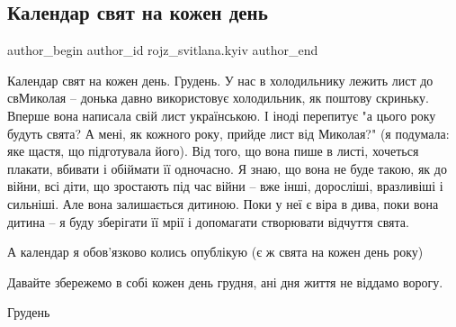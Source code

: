  
 
 
 
 
 
\subsection{Календар свят на кожен день}
\label{sec:12_12_2022.fb.rojz_svitlana.kyiv.1.kalendar}
 
\ifcmt
 author_begin
   author_id rojz_svitlana.kyiv
 author_end
\fi

Календар свят на кожен день. Грудень. У нас в холодильнику лежить лист до
свМиколая – донька давно використовує холодильник, як поштову скриньку. Вперше
вона написала свій лист українською.  І іноді перепитує "а цього року будуть
свята? А мені, як кожного року, прийде лист від Миколая?" (я подумала: яке
щастя, що підготувала його). Від того, що вона пише в листі, хочеться плакати,
вбивати і обіймати її одночасно. Я знаю, що вона не буде такою, як до війни,
всі діти, що зростають під час війни – вже інші, доросліші, вразливіші і
сильніші. Але вона залишається дитиною. Поки у неї є віра в дива, поки вона
дитина  – я буду зберігати її мрії і допомагати створювати відчуття свята. 

А календар я обов'язково колись опублікую (є ж свята на кожен день року)

Давайте збережемо в собі кожен день грудня, ані дня життя не віддамо ворогу.

Грудень

